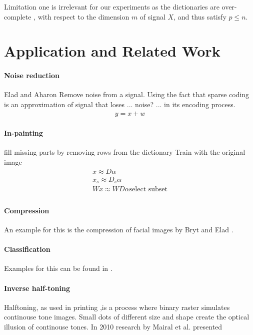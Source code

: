 Limitation one is irrelevant for our experiments as the dictionaries are over-complete 
, with respect to the dimension $m$ of signal $X$, and thus satisfy $p\leq n$.

\section{Application and Related Work}

\paragraph{Noise reduction}
Elad and Aharon\cite{Elad2006}
Remove noise from a signal. 
Using the fact that sparse coding is an approximation of signal that loses ...
noise? ... in its encoding process. 
\begin{align*}
y = x + w
\end{align*}



\paragraph{In-painting}
fill missing parts by removing rows from the dictionary
Train with the original image
\begin{align*}
x \approx D\alpha\\
x_s \approx D_s\alpha\\
Wx \approx WD\alpha\text{select subset}\\
\end{align*}

\cite{mairal08sparse}

\paragraph{Compression} \cite{Murray2006} \cite{Lewicki1999} An example for this
is the compression of facial images by Bryt and Elad \cite{Bryt2008}.

\paragraph{Classification} Examples for this can be found in
\cite{Raina2007,BradleyBagnel2009,Mairal2008,Mairal2008b,Bar2009,Yang2009}.

\paragraph{Inverse half-toning} Halftoning, as used in printing ,is a process
where binary raster simulates continouse tone images. Small dots of different
size and shape create the optical illusion of continouse tones. In 2010 research
by Mairal et al.\cite{Mairal2010b} presented 

